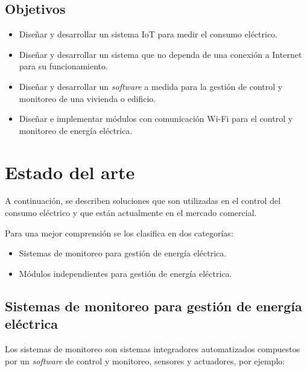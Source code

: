 \subsection{Objetivos}
\begin{itemize}
\item Diseñar y desarrollar un sistema IoT para medir el consumo eléctrico.
\item Diseñar y desarrollar un sistema que no dependa de una conexión a Internet para su funcionamiento.
\item Diseñar y desarrollar un \emph{software} a medida para la gestión de control y monitoreo de una vivienda o edificio.
\item Diseñar e implementar módulos con comunicación Wi-Fi para el control y monitoreo de energía eléctrica.
\end{itemize}

\section{Estado del arte}

A continuación, se describen soluciones que son utilizadas en el control del consumo eléctrico y que están actualmente en el mercado comercial. 

Para una mejor comprensión se los clasifica en dos categorías:

\begin{itemize}
\item Sistemas de monitoreo para gestión de energía eléctrica.
\item Módulos independientes para gestión de energía eléctrica.
\end{itemize} 

\subsection{Sistemas de monitoreo para gestión de energía eléctrica}
Los sistemas de monitoreo son sistemas integradores automatizados compuestos por un \emph{software} de control y monitoreo, sensores y actuadores, por ejemplo:


